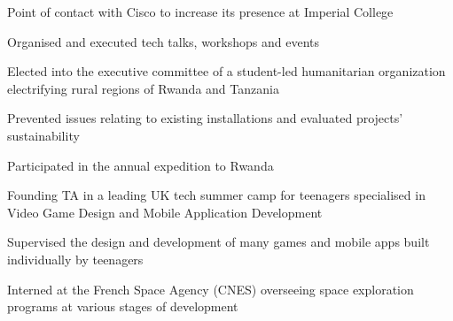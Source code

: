\documentclass[a4paper]{alex-resume}
\begin{document}
\begin{minipage}[t]{0.58\textwidth}
\begin{tightemize}
\item Point of contact with Cisco to increase its presence at Imperial College
\item Organised and executed tech talks, workshops and events
\end{tightemize}
\sectionsep

\begin{tightemize}
\item Elected into the executive committee of a student-led humanitarian organization electrifying rural regions of Rwanda and Tanzania
\item Prevented issues relating to existing installations and evaluated projects' sustainability
\item Participated in the annual expedition to Rwanda
\end{tightemize}
\sectionsep

\begin{tightemize}
\item Founding TA in a leading UK tech summer camp for teenagers specialised in Video Game Design and Mobile Application Development
\item Supervised the design and development of many games and mobile apps built individually by teenagers
\end{tightemize}
\sectionsep

\begin{tightemize}
\item Interned at the French Space Agency (CNES) overseeing space exploration programs at various stages of development
\end{tightemize}





\end{minipage}
\end{document}
